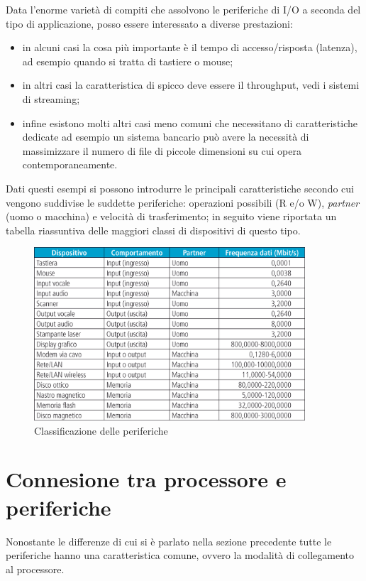 \documentclass[class=book, crop=false, oneside]{standalone}
\begin{document}
Data l'enorme varietà di compiti che assolvono le periferiche di I/O a  seconda del tipo di applicazione, posso essere interessato a diverse prestazioni:
\begin{itemize}
	\item in alcuni casi la cosa più importante è il tempo di accesso/risposta (latenza), ad esempio quando si tratta di tastiere o mouse;
	\item in altri casi la caratteristica di spicco deve essere il throughput, vedi i sistemi di streaming;
  \item infine esistono molti altri casi meno comuni che necessitano di caratteristiche dedicate ad esempio un sistema bancario può avere la necessità di massimizzare il numero di file di piccole dimensioni su cui opera contemporaneamente.
\end{itemize}

Dati questi esempi si possono introdurre le principali caratteristiche secondo cui vengono suddivise le suddette periferiche: operazioni possibili (R e/o W), \emph{partner} (uomo o macchina) e velocità di trasferimento; in seguito viene riportata un tabella riassuntiva delle maggiori classi di dispositivi di questo tipo.

\begin{figure}[!h]
	\centering
	\includegraphics[width=0.9\textwidth,keepaspectratio]{classificazione-periferiche}
	\caption{Classificazione delle periferiche}
\end{figure}

\section{Connesione tra processore e periferiche}
Nonostante le differenze di cui si è parlato nella sezione precedente tutte le periferiche hanno una caratteristica comune, ovvero la modalità di collegamento al processore.
\end{document}
